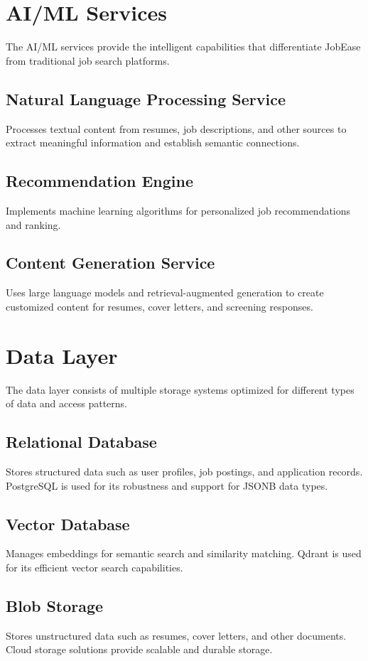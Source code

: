 \documentclass[12pt,a4paper]{report}
\begin{document}
\section{AI/ML Services}
The AI/ML services provide the intelligent capabilities that differentiate JobEase from traditional job search platforms.

\subsection{Natural Language Processing Service}
Processes textual content from resumes, job descriptions, and other sources to extract meaningful information and establish semantic connections.

\subsection{Recommendation Engine}
Implements machine learning algorithms for personalized job recommendations and ranking.

\subsection{Content Generation Service}
Uses large language models and retrieval-augmented generation to create customized content for resumes, cover letters, and screening responses.

\section{Data Layer}
The data layer consists of multiple storage systems optimized for different types of data and access patterns.

\subsection{Relational Database}
Stores structured data such as user profiles, job postings, and application records. PostgreSQL is used for its robustness and support for JSONB data types.

\subsection{Vector Database}
Manages embeddings for semantic search and similarity matching. Qdrant is used for its efficient vector search capabilities.

\subsection{Blob Storage}
Stores unstructured data such as resumes, cover letters, and other documents. Cloud storage solutions provide scalable and durable storage.
\end{document}

